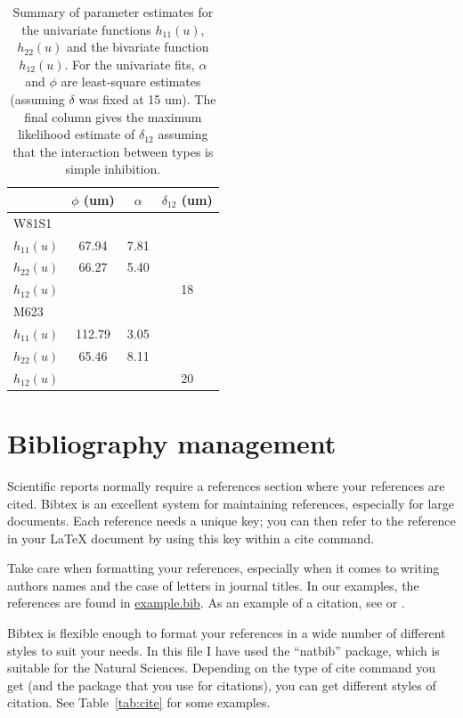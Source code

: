 \documentclass[]{article}
\providecommand*{\latex}{\LaTeX\xspace}
\begin{document}
\begin{table}[htbp]
  \centering
  \begin{tabular}{lccc}\\ \hline
              & \multicolumn{1}{c}{$\phi$ (um)}
              & \multicolumn{1}{c}{$\alpha$}
              & $\delta_{12}$ (um)\\ \hline
    W81S1\\
    $h_{11}(u)$  & 67.94 & 7.81\\
    $h_{22}(u)$  & 66.27 & 5.40\\
    $h_{12}(u)$  &       &  &18\\
    \hline
    M623\\
    $h_{11}(u)$  &112.79 &  3.05\\
    $h_{22}(u)$  & 65.46 &  8.11\\
    $h_{12}(u)$        &&&20\\
        \hline
  \end{tabular}
  \caption{Summary of parameter estimates for the univariate
    functions $h_{11}(u)$, $h_{22}(u)$ and the bivariate function
    $h_{12}(u)$.  For the univariate fits, $\alpha$ and $\phi$ are 
    least-square estimates (assuming $\delta$ was fixed at 15 um).
    The final column gives the
    maximum likelihood estimate of $\delta_{12}$ assuming that the
    interaction between types is simple inhibition.
    \label{tab:pars}}
\end{table}

\section{Bibliography management}

Scientific reports normally require a references section where your
references are cited.  Bibtex is an excellent system for maintaining
references, especially for large documents.  Each reference needs a
unique key; you can then refer to the reference in your \latex
document by using this key within a cite command.

Take care when formatting your references, especially when it comes to
writing authors names and the case of letters in journal titles.  In
our examples, the references are found in \url{example.bib}.  As an example
of a citation, see \citep{ihaka1996} or \citep{ihaka1996,venables1999}.

Bibtex is flexible enough to format your references in a wide number
of different styles to suit your needs.  In this file I have used the
``natbib'' package, which is suitable for the Natural Sciences.
Depending on the type of cite command you get (and the package that
you use for citations), you can get different styles of citation.  See
Table~\ref{tab:cite} for some examples.
\end{document}
